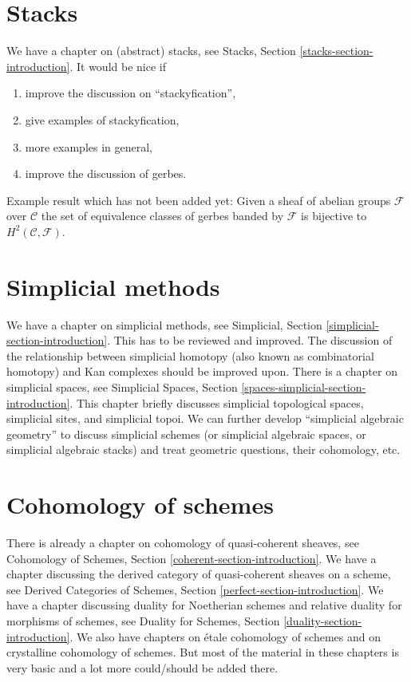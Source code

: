 \section{Stacks}
\label{section-stacks}

\noindent
We have a chapter on (abstract) stacks, see
Stacks, Section \ref{stacks-section-introduction}.
It would be nice if
\begin{enumerate}
\item improve the discussion on ``stackyfication'',
\item give examples of stackyfication,
\item more examples in general,
\item improve the discussion of gerbes.
\end{enumerate}
Example result which has not been added yet: Given a sheaf of abelian
groups $\mathcal{F}$
over $\mathcal{C}$ the set of equivalence classes of gerbes banded by
$\mathcal{F}$ is bijective to $H^2(\mathcal{C}, \mathcal{F})$.


\section{Simplicial methods}
\label{section-simplicial}

\noindent
We have a chapter on simplicial methods, see
Simplicial, Section \ref{simplicial-section-introduction}.
This has to be reviewed and improved. The discussion of
the relationship between simplicial homotopy (also known as
combinatorial homotopy) and Kan complexes should be improved upon.
There is a chapter on simplicial spaces, see
Simplicial Spaces, Section \ref{spaces-simplicial-section-introduction}.
This chapter briefly discusses
simplicial topological spaces, simplicial sites, and simplicial topoi.
We can further develop ``simplicial algebraic geometry'' to discuss
simplicial schemes (or simplicial algebraic spaces, or
simplicial algebraic stacks) and treat geometric questions, their cohomology,
etc.


\section{Cohomology of schemes}
\label{section-schemes-cohomology}

\noindent
There is already a chapter on cohomology of quasi-coherent sheaves, see
Cohomology of Schemes, Section \ref{coherent-section-introduction}.
We have a chapter discussing the derived category of
quasi-coherent sheaves on a scheme, see
Derived Categories of Schemes, Section \ref{perfect-section-introduction}.
We have a chapter discussing duality for Noetherian schemes
and relative duality for morphisms of schemes, see
Duality for Schemes, Section \ref{duality-section-introduction}.
We also have chapters on \'etale cohomology of schemes and on
crystalline cohomology of schemes. But most of the material in these
chapters is very basic and a lot more could/should be added there.



